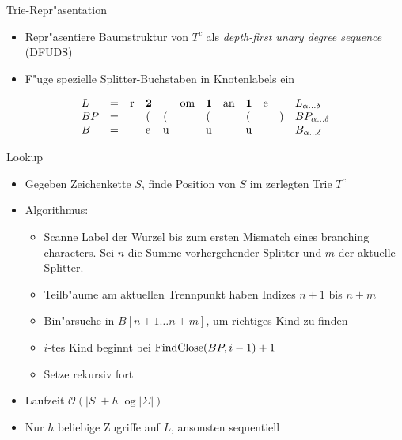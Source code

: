\documentclass[ngerman,hyperref={pdfpagelabels=true}]{beamer}
\begin{document}
\begin{frame}{Trie-Repr"asentation}

\begin{itemize}

\item Repr"asentiere Baumstruktur von $T^c$ als \emph{depth-first unary degree sequence} (DFUDS)
\item F"uge spezielle Splitter-Buchstaben in Knotenlabels ein
\end{itemize}

\centering


\[ \begin{array}{llllllllllll}
L &= &\text{\lstinline|r|} &\text{\textbf{2}}
     &&\text{\lstinline|om|} &\text{\textbf{1}}
     &\text{\lstinline|an|} &\text{\textbf{1}}
     &\text{\lstinline|e|}
     &&L_{\alpha\ldots \delta} \\
BP &= &&\text{\lstinline|(|}&\text{\lstinline|(|}
      &&\text{\lstinline|(|}
      &&\text{\lstinline|(|}
      &&\text{\lstinline|)|}
      &BP_{\alpha\ldots \delta} \\
B &= &&\text{\lstinline|e|}&\text{\lstinline|u|}
     &&\text{\lstinline|u|}
     &&\text{\lstinline|u|}
     &&&B_{\alpha\ldots \delta}
\end{array}
\]

\end{frame}

\begin{frame}{Lookup}
\begin{itemize}
\item Gegeben Zeichenkette $S$, finde Position von $S$ im zerlegten Trie $T^c$
\item Algorithmus:
\begin{itemize}
\item Scanne Label der Wurzel bis zum ersten Mismatch eines branching characters.
Sei $n$ die Summe vorhergehender Splitter und $m$ der aktuelle Splitter.
\item Teilb"aume am aktuellen Trennpunkt haben Indizes $n + 1$ bis $n + m$
\item Bin"arsuche in $B[n+1 \ldots n+m]$, um richtiges Kind zu finden
\item $i$-tes Kind beginnt bei $\text{\lstinline|FindClose|}(BP, i - 1) + 1$
\item Setze rekursiv fort
\end{itemize}
\item Laufzeit $\mathcal{O}\left(|S| + h\log |\Sigma|\right)$
\item Nur $h$ beliebige Zugriffe auf $L$, ansonsten sequentiell
\end{itemize}
\end{frame}
\end{document}
